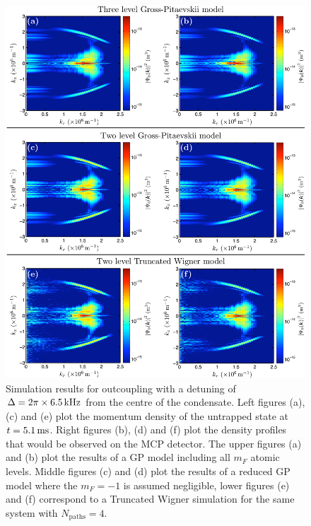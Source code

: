 \begin{figure}
    \centering
    \includegraphics[width=14cm]{DetunedOutcouplingModelComparison}
    \caption{Simulation results for outcoupling with a detuning of $\Delta = 2\pi \times \unit[6.5]{kHz}$ from the centre of the condensate. Left figures (a), (c) and (e) plot the momentum density of the untrapped state at $t=\unit[5.1]{ms}$. Right figures (b), (d) and (f) plot the density profiles that would be observed on the MCP detector. The upper figures (a) and (b) plot the results of a GP model including all $m_F$ atomic levels. Middle figures (c) and (d) plot the results of a reduced GP model where the $m_F=-1$ is assumed negligible, lower figures (e) and (f) correspond to a Truncated Wigner simulation for the same system with $N_\text{paths} = 4$.\label{Peaks:TheoryMaxFluxDetuningResults}}
\end{figure}

